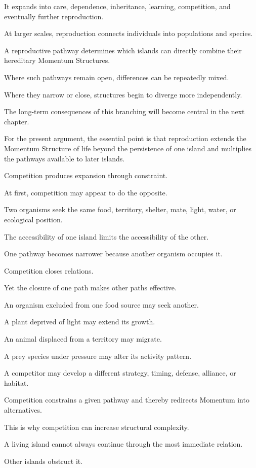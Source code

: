 It expands into care, dependence, inheritance, learning, competition, and eventually further reproduction.

At larger scales, reproduction connects individuals into populations and species.

A reproductive pathway determines which islands can directly combine their hereditary Momentum Structures.

Where such pathways remain open, differences can be repeatedly mixed.

Where they narrow or close, structures begin to diverge more independently.

The long-term consequences of this branching will become central in the next chapter.

For the present argument, the essential point is that reproduction extends the Momentum Structure of life beyond the persistence of one island and multiplies the pathways available to later islands.

Competition produces expansion through constraint.

At first, competition may appear to do the opposite.

Two organisms seek the same food, territory, shelter, mate, light, water, or ecological position.

The accessibility of one island limits the accessibility of the other.

One pathway becomes narrower because another organism occupies it.

Competition closes relations.

Yet the closure of one path makes other paths effective.

An organism excluded from one food source may seek another.

A plant deprived of light may extend its growth.

An animal displaced from a territory may migrate.

A prey species under pressure may alter its activity pattern.

A competitor may develop a different strategy, timing, defense, alliance, or habitat.

Competition constrains a given pathway and thereby redirects Momentum into alternatives.

This is why competition can increase structural complexity.

A living island cannot always continue through the most immediate relation.

Other islands obstruct it.

